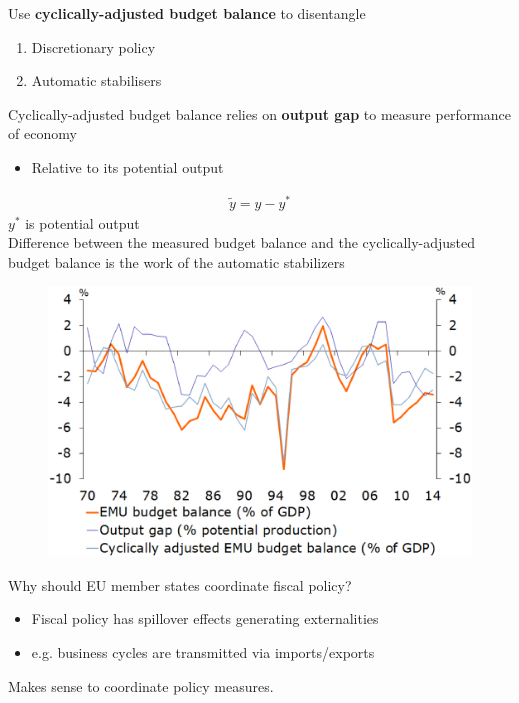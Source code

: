 \documentclass{beamer}
\begin{document}
\begin{frame}
  Use \textbf{cyclically-adjusted budget balance} to disentangle
  \begin{enumerate}
    \item Discretionary policy
    \item Automatic stabilisers
  \end{enumerate}
  \medskip
  Cyclically-adjusted budget balance relies on \textbf{output gap} to measure performance of economy
  \begin{itemize}
    \item Relative to its potential output
  \end{itemize}
\begin{align}
  \tilde{y}=y-y^*
\end{align}
$y^*$ is potential output\\
Difference between the measured budget balance and the cyclically-adjusted budget balance is the work of the automatic stabilizers
\end{frame}

\begin{frame}
  \begin{figure}
    \includegraphics[scale=.4]{nl_budget.eps}
  \end{figure}
\end{frame}


\begin{frame}  
  Why should EU member states coordinate fiscal policy?
  \begin{itemize}
    \item Fiscal policy has spillover effects generating externalities
    \item e.g. business cycles are transmitted via imports/exports
  \end{itemize}
  \medskip
  Makes sense to coordinate policy measures.  
\end{frame}
\end{document}
